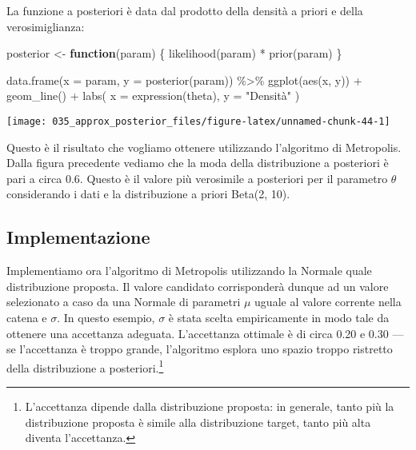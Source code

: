 \documentclass[
]{memoir}
\newenvironment{Shaded}{\begin{snugshade}}{\end{snugshade}}
\newcommand{\AttributeTok}[1]{\textcolor[rgb]{0.77,0.63,0.00}{#1}}
\newcommand{\ControlFlowTok}[1]{\textcolor[rgb]{0.13,0.29,0.53}{\textbf{#1}}}
\newcommand{\FunctionTok}[1]{\textcolor[rgb]{0.00,0.00,0.00}{#1}}
\newcommand{\NormalTok}[1]{#1}
\newcommand{\OtherTok}[1]{\textcolor[rgb]{0.56,0.35,0.01}{#1}}
\newcommand{\SpecialCharTok}[1]{\textcolor[rgb]{0.00,0.00,0.00}{#1}}
\newcommand{\StringTok}[1]{\textcolor[rgb]{0.31,0.60,0.02}{#1}}
\begin{document}
La funzione a posteriori è data dal prodotto della densità a priori e della verosimiglianza:

\begin{Shaded}
\begin{Highlighting}[]
\NormalTok{posterior }\OtherTok{\textless{}{-}} \ControlFlowTok{function}\NormalTok{(param) \{}
  \FunctionTok{likelihood}\NormalTok{(param) }\SpecialCharTok{*} \FunctionTok{prior}\NormalTok{(param)}
\NormalTok{\}}

\FunctionTok{data.frame}\NormalTok{(}\AttributeTok{x =}\NormalTok{ param, }\AttributeTok{y =} \FunctionTok{posterior}\NormalTok{(param)) }\SpecialCharTok{\%\textgreater{}\%}
  \FunctionTok{ggplot}\NormalTok{(}\FunctionTok{aes}\NormalTok{(x, y)) }\SpecialCharTok{+}
  \FunctionTok{geom\_line}\NormalTok{() }\SpecialCharTok{+}
  \FunctionTok{labs}\NormalTok{(}
    \AttributeTok{x =} \FunctionTok{expression}\NormalTok{(theta),}
    \AttributeTok{y =} \StringTok{"Densità"}
\NormalTok{  )}
\end{Highlighting}
\end{Shaded}

\begin{center}\texttt{[image: 035\_approx\_posterior\_files/figure-latex/unnamed-chunk-44-1]} \end{center}

Questo è il risultato che vogliamo ottenere utilizzando l'algoritmo di Metropolis. Dalla figura precedente vediamo che la moda della distribuzione a posteriori è pari a circa 0.6. Questo è il valore più verosimile a posteriori per il parametro \(\theta\) considerando i dati e la distribuzione a priori Beta(2, 10).

\hypertarget{implementazione}{%
\subsection{Implementazione}\label{implementazione}}

Implementiamo ora l'algoritmo di Metropolis utilizzando la Normale quale distribuzione proposta. Il valore candidato corrisponderà dunque ad un valore selezionato a caso da una Normale di parametri \(\mu\) uguale al valore corrente nella catena e \(\sigma\). In questo esempio, \(\sigma\) è stata scelta empiricamente in modo tale da ottenere una accettanza adeguata. L'accettanza ottimale è di circa 0.20 e 0.30 --- se l'accettanza è troppo grande, l'algoritmo esplora uno spazio troppo ristretto della distribuzione a posteriori.\footnote{L'accettanza dipende dalla distribuzione proposta: in generale, tanto più la distribuzione proposta è simile alla distribuzione target, tanto più alta diventa l'accettanza.}
\end{document}
